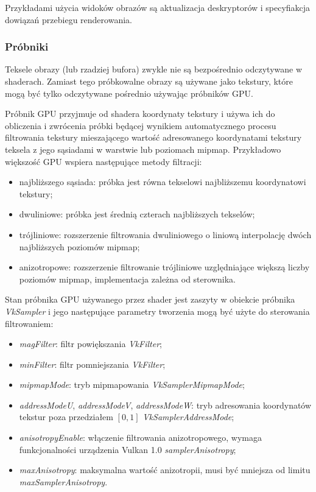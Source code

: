 Przykładami użycia widoków obrazów są aktualizacja deskryptorów i specyfiakcja dowiązań przebiegu renderowania.

\subsubsection{Próbniki}

Teksele obrazy (lub rzadziej bufora) zwykle nie są bezpośrednio odczytywane w shaderach.
Zamiast tego próbkowalne obrazy są używane jako tekstury, które mogą być tylko odczytywane pośrednio używając próbników GPU.

Próbnik GPU przyjmuje od shadera koordynaty tekstury i używa ich do obliczenia i zwrócenia próbki będącej wynikiem automatycznego procesu filtrowania tekstury mieszającego wartość adresowanego koordynatami tekstury teksela z jego sąsiadami w warstwie lub poziomach mipmap.
Przykładowo większość GPU wspiera następujące metody filtracji:
\begin{itemize}
	\item najbliższego sąsiada: próbka jest równa tekselowi najbliższemu koordynatowi tekstury;
	\item dwuliniowe: próbka jest średnią czterach najbliższych tekselów;
	\item trójliniowe: rozszerzenie filtrowania dwuliniowego o liniową interpolację dwóch najbliższych poziomów mipmap;
	\item anizotropowe: rozszerzenie filtrowanie trójliniowe uzględniające większą liczby poziomów mipmap, implementacja zależna od sterownika.
\end{itemize}

Stan próbnika GPU używanego przez shader jest zaszyty w obiekcie próbnika \textit{VkSampler} i jego następujące parametry tworzenia mogą być użyte do sterowania filtrowaniem:
\begin{itemize}
	\item \textit{magFilter}: filtr powiększania \textit{VkFilter};
	\item \textit{minFilter}: filtr pomniejszania \textit{VkFilter};
	\item \textit{mipmapMode}: tryb mipmapowania \textit{VkSamplerMipmapMode};
	\item \textit{addressModeU}, \textit{addressModeV}, \textit{addressModeW}: tryb adresowania koordynatów tekstur poza przedziałem $\left[0,1\right]$ \textit{VkSamplerAddressMode};
	\item \textit{anisotropyEnable}: włączenie filtrowania anizotropowego, wymaga funkcjonalności urządzenia Vulkan 1.0 \textit{samplerAnisotropy};
	\item \textit{maxAnisotropy}: maksymalna wartość anizotropii, musi być mniejsza od limitu \textit{maxSamplerAnisotropy}.
\end{itemize}


